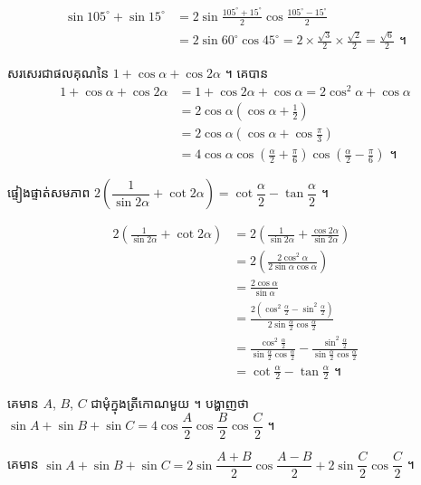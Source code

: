 \begin{example}[ឧទាហរណ៍ ១៤]
\[
\begin{aligned}
\sin 105^\circ + \sin 15^\circ &= 2\sin\frac{105^\circ + 15^\circ}{2}\cos\frac{105^\circ - 15^\circ}{2}\\
&= 2\sin 60^\circ\cos 45^\circ = 2 \times \frac{\sqrt{3}}{2} \times \frac{\sqrt{2}}{2} = \frac{\sqrt{6}}{2} \text{ ។}
\end{aligned}
\]
\end{example}

\begin{example}[ឧទាហរណ៍ ១៥]
សរសេរជាផលគុណនៃ $1 + \cos\alpha + \cos 2\alpha$ ។ គេបាន
\[
\begin{aligned}
1 + \cos\alpha + \cos 2\alpha &= 1 + \cos 2\alpha + \cos\alpha = 2\cos^2\alpha + \cos\alpha\\
&= 2\cos\alpha\left(\cos\alpha + \frac{1}{2}\right)\\
&= 2\cos\alpha\left(\cos\alpha + \cos\frac{\pi}{3}\right)\\
&= 4\cos\alpha\cos\left(\frac{\alpha}{2} + \frac{\pi}{6}\right)\cos\left(\frac{\alpha}{2} - \frac{\pi}{6}\right) \text{ ។}
\end{aligned}
\]
\end{example}

\begin{example}[លំហាត់គំរូ ៧]
ផ្ទៀងផ្ទាត់សមភាព $2\left(\dfrac{1}{\sin 2\alpha} + \cot 2\alpha\right) = \cot\dfrac{\alpha}{2} - \tan\dfrac{\alpha}{2}$ ។
\end{example}
\ans
\[
\begin{aligned}
2\left(\frac{1}{\sin 2\alpha} + \cot 2\alpha\right) &= 2\left(\frac{1}{\sin 2\alpha} + \frac{\cos 2\alpha}{\sin 2\alpha}\right)\\
&= 2\left(\frac{2\cos^2\alpha}{2\sin\alpha\cos\alpha}\right)\\
&= \frac{2\cos\alpha}{\sin\alpha}\\
&= \frac{2\left(\cos^2\frac{\alpha}{2} - \sin^2\frac{\alpha}{2}\right)}{2\sin\frac{\alpha}{2}\cos\frac{\alpha}{2}}\\
&= \frac{\cos^2\frac{\alpha}{2}}{\sin\frac{\alpha}{2}\cos\frac{\alpha}{2}} - \frac{\sin^2\frac{\alpha}{2}}{\sin\frac{\alpha}{2}\cos\frac{\alpha}{2}}\\
&= \cot\frac{\alpha}{2} - \tan\frac{\alpha}{2} \text{ ។}
\end{aligned}
\]

\begin{example}[លំហាត់គំរូ ៨]
គេមាន $A$, $B$, $C$ ជាមុំក្នុងត្រីកោណមួយ ។ បង្ហាញថា $\sin A + \sin B + \sin C = 4\cos\dfrac{A}{2}\cos\dfrac{B}{2}\cos\dfrac{C}{2}$ ។
\end{example}
\ans
គេមាន $\sin A + \sin B + \sin C = 2\sin\dfrac{A + B}{2}\cos\dfrac{A - B}{2} + 2\sin\dfrac{C}{2}\cos\dfrac{C}{2}$ ។

